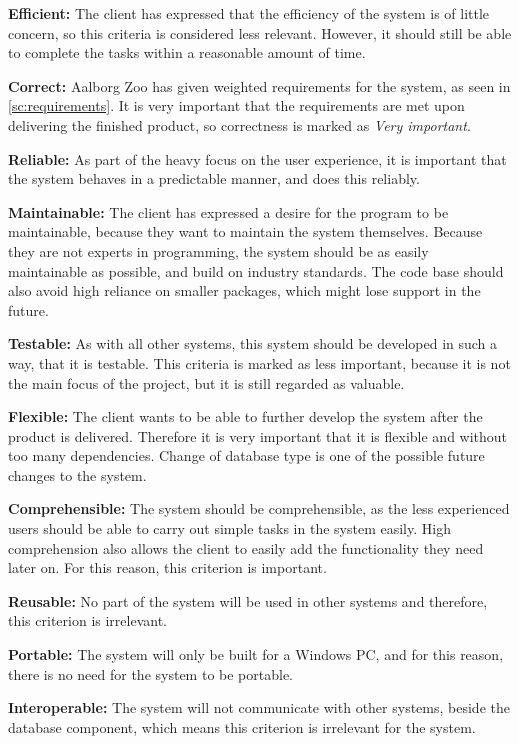 \textbf{Efficient:} The client has expressed that the efficiency of the system is of little concern, so this criteria is considered less relevant. However, it should still be able to complete the tasks within a reasonable amount of time.

\textbf{Correct:} Aalborg Zoo has given weighted requirements for the system, as seen in \autoref{sc:requirements}. It is very important that the requirements are met upon delivering the finished product, so correctness is marked as \textit{Very important}.

\textbf{Reliable:} As part of the heavy focus on the user experience, it is important that the system behaves in a predictable manner, and does this reliably.

\textbf{Maintainable:} The client has expressed a desire for the program to be maintainable, because they want to maintain the system themselves. Because they are not experts in programming, the system should be as easily maintainable as possible, and build on industry standards. The code base should also avoid high reliance on smaller packages, which might lose support in the future.

\textbf{Testable:} As with all other systems, this system should be developed in such a way, that it is testable. This criteria is marked as less important, because it is not the main focus of the project, but it is still regarded as valuable.

\textbf{Flexible:} The client wants to be able to further develop the system after the product is delivered. Therefore it is very important that it is flexible and without too many dependencies. Change of database type is one of the possible future changes to the system.

\textbf{Comprehensible:} The system should be comprehensible, as the less experienced users should be able to carry out simple tasks in the system easily. High comprehension also allows the client to easily add the functionality they need later on. For this reason, this criterion is important.

\textbf{Reusable:} No part of the system will be used in other systems and therefore, this criterion is irrelevant.

\textbf{Portable:} The system will only be built for a Windows PC, and for this reason, there is no need for the system to be portable. 

\textbf{Interoperable:} The system will not communicate with other systems, beside the database component, which means this criterion is irrelevant for the system.